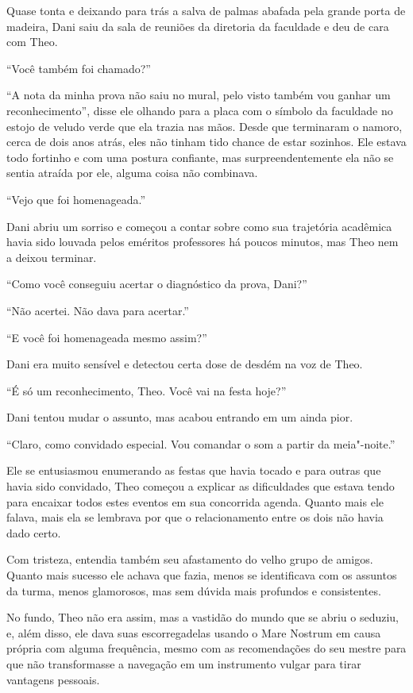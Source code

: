 Quase tonta e deixando para trás a salva de palmas abafada pela grande
porta de madeira, Dani saiu da sala de reuniões da diretoria da
faculdade e deu de cara com Theo.

``Você também foi chamado?''

``A nota da minha prova não saiu no mural, pelo visto também vou ganhar
um reconhecimento'', disse ele olhando para a placa com o símbolo da
faculdade no estojo de veludo verde que ela trazia nas mãos. Desde que
terminaram o namoro, cerca de dois anos atrás, eles não tinham tido
chance de estar sozinhos. Ele estava todo fortinho e com uma postura
confiante, mas surpreendentemente ela não se sentia atraída por ele,
alguma coisa não combinava.

``Vejo que foi homenageada.''

Dani abriu um sorriso e começou a contar sobre como sua trajetória
acadêmica havia sido louvada pelos eméritos professores há poucos
minutos, mas Theo nem a deixou terminar.

``Como você conseguiu acertar o diagnóstico da prova, Dani?''

``Não acertei. Não dava para acertar.''

``E você foi homenageada mesmo assim?''

Dani era muito sensível e detectou certa dose de desdém na voz de Theo.

``É só um reconhecimento, Theo. Você vai na festa hoje?''

Dani tentou mudar o assunto, mas acabou entrando em um ainda pior.

``Claro, como convidado especial. Vou comandar o som a partir da
meia"-noite.''

Ele se entusiasmou enumerando as festas que havia tocado e para outras
que havia sido convidado, Theo começou a explicar as dificuldades que
estava tendo para encaixar todos estes eventos em sua concorrida agenda.
Quanto mais ele falava, mais ela se lembrava por que o relacionamento
entre os dois não havia dado certo.

Com tristeza, entendia também seu afastamento do velho grupo de amigos.
Quanto mais sucesso ele achava que fazia, menos se identificava com
os assuntos da turma, menos glamorosos, mas sem dúvida mais profundos e
consistentes.

No fundo, Theo não era assim, mas a vastidão do mundo que se abriu o
seduziu, e, além disso, ele dava suas escorregadelas usando o Mare
Nostrum em causa própria com alguma frequência, mesmo com as recomendações
do seu mestre para que não transformasse a navegação em um instrumento
vulgar para tirar vantagens pessoais.

